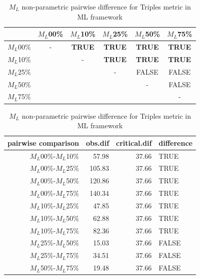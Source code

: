 \documentclass[12pt,letterpaper]{article}
\begin{document}
\begin{table}
\caption{$M_L$ non-parametric pairwise difference for Triples metric in ML framework} %
\centering
\begin{tabular}{c|ccccc}
    \hline
              & $M_L$00\% & $M_L$10\% & $M_L$25\% & $M_L$50\% & $M_L$75\% \\
    \hline
    $M_L$00\% & - & \textbf{TRUE}  & \textbf{TRUE} & \textbf{TRUE} & \textbf{TRUE}\\
    $M_L$10\% & & - & \textbf{TRUE}  & \textbf{TRUE} & \textbf{TRUE} \\
    $M_L$25\% & & & - & FALSE  & FALSE \\
    $M_L$50\% & & & & - & FALSE  \\
    $M_L$75\% & & & & & - \\
    \hline
\end{tabular}
\centering
\begin{tabular}{rrrl}
 pairwise comparison & obs.dif & critical.dif & difference \\ 
  \hline
  $M_L$00\%-$M_L$10\% & 57.98 & 37.66 & TRUE \\ 
  $M_L$00\%-$M_L$25\% & 105.83 & 37.66 & TRUE \\ 
  $M_L$00\%-$M_L$50\% & 120.86 & 37.66 & TRUE \\ 
  $M_L$00\%-$M_L$75\% & 140.34 & 37.66 & TRUE \\ 
  $M_L$10\%-$M_L$25\% & 47.85 & 37.66 & TRUE \\ 
  $M_L$10\%-$M_L$50\% & 62.88 & 37.66 & TRUE \\ 
  $M_L$10\%-$M_L$75\% & 82.36 & 37.66 & TRUE \\ 
  $M_L$25\%-$M_L$50\% & 15.03 & 37.66 & FALSE \\ 
  $M_L$25\%-$M_L$75\% & 34.51 & 37.66 & FALSE \\ 
  $M_L$50\%-$M_L$75\% & 19.48 & 37.66 & FALSE \\ 
   \hline
\end{tabular}
\label{ML_Tr-ML_results}
\end{table}
\end{document}
